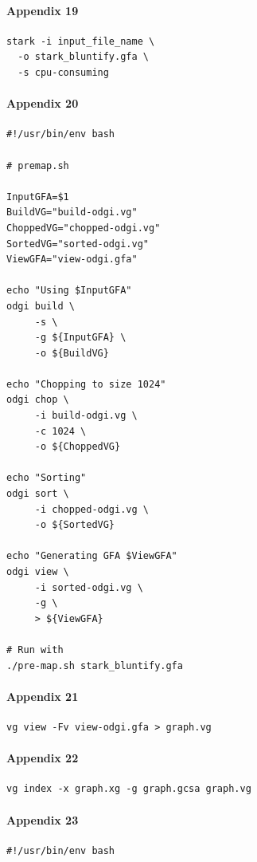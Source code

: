 \documentclass[10pt, a4paper]{article}
\begin{document}
\begin{appendices}
\paragraph{Appendix 19}
\label{sec:org9f7f1c5}
\begin{verbatim}
stark -i input_file_name \
  -o stark_bluntify.gfa \
  -s cpu-consuming
\end{verbatim}

\paragraph{Appendix 20}
\label{sec:orge1edb41}
\begin{verbatim}
#!/usr/bin/env bash

# premap.sh

InputGFA=$1
BuildVG="build-odgi.vg"
ChoppedVG="chopped-odgi.vg"
SortedVG="sorted-odgi.vg"
ViewGFA="view-odgi.gfa"

echo "Using $InputGFA"
odgi build \
     -s \
     -g ${InputGFA} \
     -o ${BuildVG}

echo "Chopping to size 1024"
odgi chop \
     -i build-odgi.vg \
     -c 1024 \
     -o ${ChoppedVG}

echo "Sorting"
odgi sort \
     -i chopped-odgi.vg \
     -o ${SortedVG}

echo "Generating GFA $ViewGFA"
odgi view \
     -i sorted-odgi.vg \
     -g \
     > ${ViewGFA}

# Run with
./pre-map.sh stark_bluntify.gfa
\end{verbatim}

\paragraph{Appendix 21}
\label{sec:orge7c457f}
\begin{verbatim}
vg view -Fv view-odgi.gfa > graph.vg
\end{verbatim}

\paragraph{Appendix 22}
\label{sec:orgd3e6444}
\begin{verbatim}
vg index -x graph.xg -g graph.gcsa graph.vg
\end{verbatim}

\paragraph{Appendix 23}
\label{sec:orgc337d67}
\begin{verbatim}
#!/usr/bin/env bash


\end{verbatim}
\end{appendices}
\end{document}
